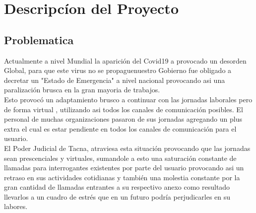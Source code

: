 \documentclass[twoside,twocolumn]{article}
\begin{document}
\section{Descripcíon del Proyecto}
\subsection{Problematica}
Actualmente a nivel Mundial la aparición del Covid19 a provocado un desorden Global, para que este virus no se propaguenuestro Gobierno fue obligado a decretar un "Estado de Emergencia" a nivel nacional provocando asi una paralización brusca en la gran mayoria de trabajos.
\\
Esto provocó un adaptamiento brusco a continuar con las jornadas laborales pero de forma virtual , utilizando asi todos los canales de comunicación posibles.
El personal de muchas organizaciones pasaron de sus jornadas agregando un plus extra el cual es estar pendiente en todos los canales de comunicación para el usuario.
\\
El Poder Judicial de Tacna, atraviesa esta situación provocando que las jornadas sean prescenciales y virtuales, sumandole a esto una saturación constante de llamadas para  interrogantes existentes por parte del usuario provocando asi un retraso en sus actividades cotidianas y también una molestia constante por la gran cantidad de llamadas entrantes a su respectivo anexo como resultado llevarlos a un cuadro de estrés que en un futuro podría perjudicarles en su labores.
\end{document}
